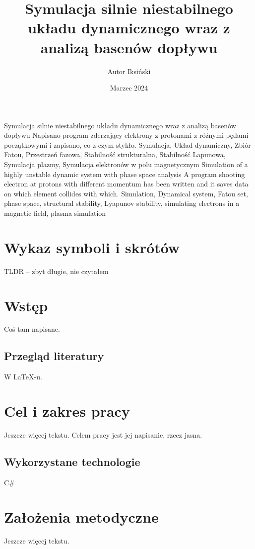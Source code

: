 \documentclass{SGGW-thesis}
\title{Symulacja silnie niestabilnego układu dynamicznego wraz z analizą basenów dopływu}
\author{Autor Iksiński}
\date{Marzec 2024}
\begin{document}
\maketitle
\statementpage
\abstractpage
{Symulacja silnie niestabilnego układu dynamicznego wraz z analizą basenów dopływu}
{Napisano program zderzający elektrony z protonami z różnymi pędami początkowymi i zapisano, co z czym stykło.}
{Symulacja, Układ dynamiczny, Zbiór Fatou, Przestrzeń fazowa, Stabilność strukturalna, Stabilność Lapunowa, Symulacja plazmy, Symulacja elektronów w polu magnetycznym}
{Simulation of a highly unstable dynamic system with phase space analysis}
{A program shooting electron at protons with different momentum has been written and it saves data on which element collides with which.}
{Simulation, Dynamical system, Fatou set, phase space, structural stability, Lyapunov stability, simulating electrons in a magnetic field, plasma simulation}

{
  \doublespacing
  \tableofcontents
}

\startchapterfromoddpage %

\chapter{Wykaz symboli i skrótów}
TLDR -- zbyt długie, nie czytałem

\chapter{Wstęp}
Coś tam napisane. 

\section{Przegląd literatury}
W \LaTeX-u.\cite{talbot2013}

\chapter{Cel i zakres pracy}
Jeszcze więcej tekstu. Celem pracy jest jej napisanie, rzecz jasna.
\section{Wykorzystane technologie}
C\#

\chapter{Założenia metodyczne}
Jeszcze więcej tekstu.
\end{document}
